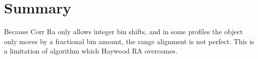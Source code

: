 \documentclass[class=report,11pt,crop=false]{standalone}
\begin{document}
\section{Summary}
Because Corr Ra only allows integer bin shifts, and in some profiles the object only moves by a fractional bin amount, the range alignment is not perfect. This is a limitation of algorithm which Haywood RA overcomes.
\ifstandalone

\printnoidxglossary[type=\acronymtype,nonumberlist]
\fi
\end{document}
